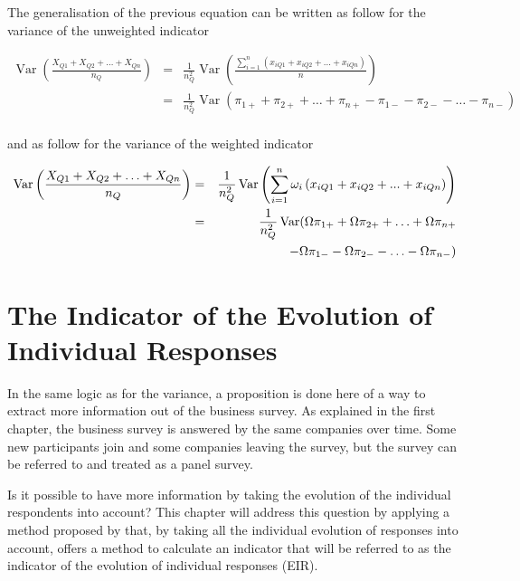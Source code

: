 \documentclass[12pt,a4paper,oneside]{book}
\DeclareMathOperator{\Var}{Var}
\begin{document}
The generalisation of the previous equation can be written as follow for the variance of the unweighted indicator

\begin{eqnarray}
    \Var \left(\frac{X_{Q1} + X_{Q2} + \ldots + X_{Qn}}{n_Q} \right) 
    &=& \frac{1}{n_Q^2} \Var \left(\frac{\sum_{i=1}^n \left(x_{i Q1} + x_{i Q2} + ... + x_{i Qn} \right)}{n} \right) \nonumber \\
    &=& \frac{1}{n_Q^2} \Var \left(\pi_{1+} + \pi_{2+} + \ldots + \pi_{n+} - \pi_{1-} - \pi_{2-} - \ldots - \pi_{n-} \right) \nonumber \\
\end{eqnarray}

and as follow for the variance of the weighted indicator

\begin{eqnarray}
    \Var \left(\frac{X_{Q1} + X_{Q2} + \ldots + X_{Qn}}{n_Q} \right) 
    &=& \frac{1}{n_Q^2} \Var \left( \sum_{i=1}^n \omega_i \left(x_{i Q1} + x_{i Q2} + ... + x_{i Qn} \right) \right) \nonumber \\
    &=& \frac{1}{n_Q^2} \Var \Large(\Omega \pi_{1+} + \Omega \pi_{2+} + \ldots + \Omega \pi_{n+} \nonumber \\
    && - \Omega \pi_{1-} - \Omega \pi_{2-} - \ldots - \Omega \pi_{n-} \Large)
\end{eqnarray}




\chapter{The Indicator of the Evolution of Individual Responses}

In the same logic as for the variance, a proposition is done here of a way to extract more information out of the business survey. 
As explained in the first chapter, the business survey is answered by the same companies over time. Some new participants join and some companies leaving the survey, but the survey can be referred to and treated as a panel survey.

Is it possible to have more information by taking the evolution of the individual respondents into account? 
This chapter will address this question by applying a method proposed by \cite{caron_estimation_1996} that, by taking all the individual evolution of responses into account, offers a method to calculate an indicator that will be referred to as the indicator of the evolution of individual responses (EIR).
\end{document}
